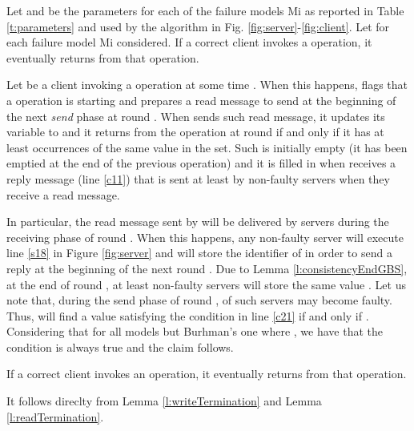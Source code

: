 \begin{lemma}\label{l:readTermination}


Let  and  be the parameters for each of the  failure models Mi as reported in Table \ref{t:parameters} and used by the algorithm in Fig. \ref{fig:server}-\ref{fig:client}.
Let  for each failure model Mi considered. 
If a correct client invokes a  operation, it eventually returns from that operation. 
\end{lemma}

\begin{proofL}
Let  be a client invoking a  operation at some time . 
When this happens,  flags that a  operation is starting and prepares a {\sc read} message to send at the beginning of the next {\em send} phase at round . 
When  sends such {\sc read} message, it updates its  variable to  and it returns from the  operation at round  if and only if it has at least  occurrences of the same value in the  set.
Such  is initially empty (it has been emptied at the end of the previous  operation) and it is filled in when  receives a {\sc reply} message (line \ref{c11}) that is sent at least by non-faulty servers when they receive a {\sc read} message.

In particular, the {\sc read} message sent by  will be delivered by servers during the receiving phase of round . When this happens, any non-faulty server will execute line \ref{s18} in Figure \ref{fig:server} and will store the identifier of  in order to send a reply at the beginning of the next round . 
Due to Lemma \ref{l:consistencyEndGBS}, at the end of round , at least  non-faulty servers will store the same value .
Let us note that, during the send phase of round ,  of such servers may become faulty.
Thus,  will find a value satisfying the condition in line \ref{c21} if and only if .
Considering that  for all models but Burhman's one where , we have that the condition is always true and the claim follows.


	
\renewcommand{\toto}{l:readTermination}
\end{proofL}

\begin{theorem}[Termination]\label{t:termination}
	If a correct client invokes an operation, it eventually returns from that operation. 
\end{theorem}

\begin{proofT}
	It follows direclty from Lemma \ref{l:writeTermination} and Lemma \ref{l:readTermination}.
	\renewcommand{\toto}{t:termination}
\end{proofT}

